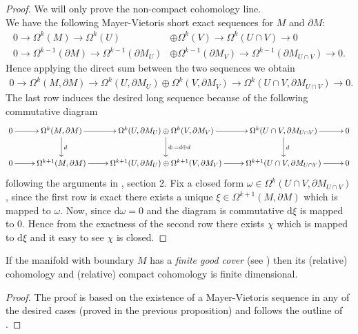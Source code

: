 \begin{proof} We will only prove the non-compact cohomology line.\\
	We have the following Mayer-Vietoris short exact sequences for $M$ and $\partial M$:
	\begin{align*}
	0\longrightarrow\Omega^k(M)\longrightarrow\Omega^k(U)&\oplus\Omega^k(V)\longrightarrow\Omega^k(U\cap V)\longrightarrow 0\\
	0\to  \Omega^{k-1}(\partial M)\to\Omega^{k-1}(\partial M_U)&\oplus\Omega^{k-1}(\partial M_V)\to\Omega^{k-1}(\partial M_{U\cap V})\to 0.
	\end{align*}
	Hence applying the direct sum between the two sequences we obtain
	\begin{align*}
	0\longrightarrow\Omega^k(M,\partial M)\longrightarrow\Omega^k(U,\partial M_U)\oplus\Omega^k(V,\partial M_V)\longrightarrow\Omega^k(U\cap V,\partial M_{U\cap V})\longrightarrow 0.
	\end{align*}
	The last row induces the desired long sequence because of the following commutative diagram
	\begin{equation}
	\xymatrix{
		0 \ar[r] &\Omega^k(M,\partial M) \ar[d]^d \ar[r] &\Omega^k(U,\partial M_U)\oplus\Omega^k(V,\partial M_V)\ar[d]^{\mathrm{d}:=d\oplus d} \ar[r] &\Omega^k(U\cap V,\partial M_{U\cap V}) \ar[d]^d \ar[r] &0 \\
		0 \ar[r] &\Omega^{k+1}(M,\partial M) \ar[r] &\Omega^{k+1}(U,\partial M_U)\oplus\Omega^{k+1}(V,\partial M_V)\ar[r] &\Omega^{k+1}(U\cap V,\partial M_{U\cap V}) \ar[r] &0}
	\end{equation}
	following the arguments in \cite{Bott-Tu-82}, section 2. Fix a closed form $\omega\in\Omega^k(U\cap V,\partial M_{U\cap V})$, since the first row is exact there exists a unique $\xi\in\Omega^{k+1}(M,\partial M)$ which is mapped to $\omega$. Now, since $\mathrm{d}\omega=0$ and the diagram is commutative $\mathrm{d}\xi$ is mapped to $0$. Hence from the exactness of the second row there exists $\chi$ which is mapped to $\mathrm{d}\xi$ and it easy to see $\chi$ is closed.
\end{proof}

\begin{lemm}
	If the manifold with boundary $M$ has a \emph{finite good cover} (see \cite[Sec. 5]{Bott-Tu-82}) then its (relative) cohomology and (relative) compact cohomology is finite dimensional.
\end{lemm}

\begin{proof}
	The proof is based on the existence of a Mayer-Vietoris sequence in any of the desired cases (proved in the previous proposition) and follows the outline of \cite[Prop. 5.3.1]{Bott-Tu-82}.
\end{proof}

